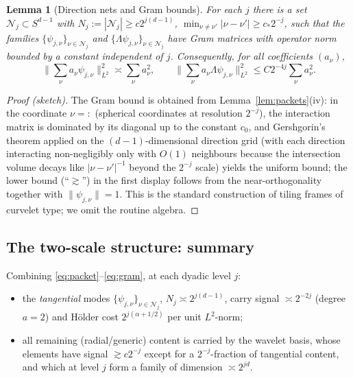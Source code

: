 \documentclass[11pt]{amsart}
\newtheorem{lemma}[theorem]{Lemma}
\newcommand{\1}{\mathbf{1}}
\newcommand{\N}{\mathcal{N}}
\begin{document}
\begin{lemma}[Direction nets and Gram bounds]\label{lem:net}
For each $j$ there is a set $\N_j\subset S^{d-1}$ with
$N_j:=|\N_j|\ge c2^{j(d-1)}$, $\min_{\nu\ne\nu'}|\nu-\nu'|\ge c_*2^{-j}$,
such that the families $\{\psi_{j,\nu}\}_{\nu\in\N_j}$ and
$\{\Lambda\psi_{j,\nu}\}_{\nu\in\N_j}$ have Gram matrices with operator norm
bounded by a constant independent of $j$. Consequently, for all coefficients
$(a_\nu)$,
\begin{equation}\label{eq:gram}
\Big\|\sum_{\nu}a_\nu\psi_{j,\nu}\Big\|_{L^2}^2\asymp\sum_\nu a_\nu^2,
\qquad
\Big\|\sum_{\nu}a_\nu\Lambda\psi_{j,\nu}\Big\|_{L^2}^2
\le C2^{-4j}\sum_\nu a_\nu^2 .
\end{equation}
\end{lemma}

\begin{proof}[Proof (sketch)]
The Gram bound is obtained from Lemma~\ref{lem:packets}(iv): in the
coordinate $\nu=:$ (spherical coordinates at resolution $2^{-j}$), the
interaction matrix is dominated by its diagonal up to the constant $c_0$,
and Gershgorin's theorem applied on the $(d-1)$-dimensional direction grid
(with each direction interacting non-negligibly only with $O(1)$ neighbours
because the intersection volume decays like $|\nu-\nu'|^{-1}$ beyond the
$2^{-j}$ scale) yields the uniform bound; the lower bound
(``$\gtrsim$'') in the first display follows from the near-orthogonality
together with $\|\psi_{j,\nu}\|=1$. This is the standard construction of
tiling frames of curvelet type; we omit the routine algebra.
\end{proof}

\subsection{The two-scale structure: summary}
Combining \eqref{eq:packet}--\eqref{eq:gram}, at each dyadic level $j$:
\begin{itemize}
\item the \emph{tangential} modes $\{\psi_{j,\nu}\}_{\nu\in\N_j}$,
  $N_j\asymp 2^{j(d-1)}$, carry signal $\asymp 2^{-2j}$ (degree $a=2$) and
  H\"older cost $2^{j(\alpha+1/2)}$ per unit $L^2$-norm;
\item all remaining (radial/generic) content is carried by the wavelet basis,
  whose elements have signal $\gtrsim c2^{-j}$ except for a
  $2^{-j}$-fraction of tangential content, and which at level $j$ form a
  family of dimension $\asymp 2^{jd}$.
\end{itemize}
\end{document}
